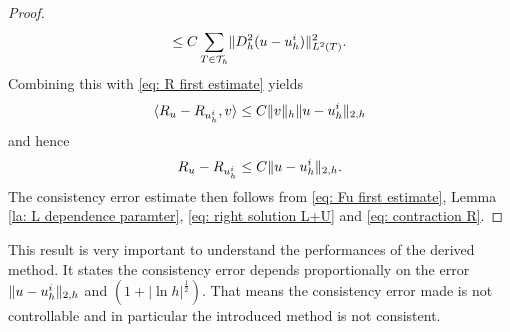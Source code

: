 \begin{proof}
\begin{align}
	\leq C \sum_{T \in \mathcal{T}_h} \lVert D_h^2 (u-u_h^i) \rVert_{L^2(T)}^2.
	\end{align}
	Combining this with \eqref{eq: R first estimate} yields
	\begin{align*}
	 \langle R_u - R_{u^i_h}, v \rangle \leq C \lVert v \rVert_{h} \lVert u-u_h^i \rVert_{2,h}
	\end{align*}
	and hence 
	\begin{align}
	{R_u - R_{u^i_h}} \leq C \lVert u-u_h^i \rVert_{2,h}. \label{eq: contraction R}
	\end{align}
	The consistency error estimate then follows from \eqref{eq: Fu first estimate}, Lemma \ref{la: L dependence paramter}, \eqref{eq: right solution L+U} and \eqref{eq: contraction R}.
\end{proof}

This result is very important to understand the performances of the derived method. It states the consistency error depends proportionally on the error $\lVert u-u^i_h \rVert_{2,h}$ and $(1+|\ln h|^{\frac 1 2})$. That means the consistency error made is not controllable and in particular the introduced method is not consistent.

